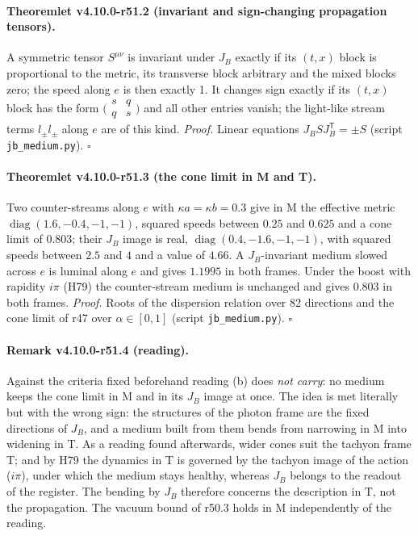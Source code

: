 \paragraph{Theoremlet v4.10.0-r51.2 (invariant and sign-changing propagation tensors).}
A symmetric tensor \(S^{\mu\nu}\) is invariant under \(J_B\) exactly if its \((t,x)\) block is proportional to the metric, its transverse block arbitrary and the mixed blocks
zero; the speed along \(e\) is then exactly 1.  It changes sign exactly if its \((t,x)\) block has the form \(\bigl(\begin{smallmatrix}s&q\\q&s\end{smallmatrix}\bigr)\) and all other entries vanish; the light-like
stream terms \(l_\pm l_\pm\) along \(e\) are of this kind.
\emph{Proof.} Linear equations \(J_BSJ_B^{\mathsf T}=\pm S\) (script \texttt{jb\_\allowbreak medium.py}).  \(\square\)

\paragraph{Theoremlet v4.10.0-r51.3 (the cone limit in M and T).}
Two counter-streams along \(e\) with \(\kappa a=\kappa b=0.3\) give in M the effective metric \(\operatorname{diag}(1.6,-0.4,-1,-1)\), squared speeds between \(0.25\) and \(0.625\) and a cone limit of
\(0.803\); their \(J_B\) image is real, \(\operatorname{diag}(0.4,-1.6,-1,-1)\), with squared speeds between \(2.5\) and \(4\) and a value of \(4.66\).  A \(J_B\)-invariant medium slowed across \(e\) is luminal along \(e\)
and gives \(1.1995\) in both frames.  Under the boost with rapidity \(i\pi\) (H79) the counter-stream medium is unchanged and gives \(0.803\) in both frames.
\emph{Proof.} Roots of the dispersion relation over 82 directions and the cone limit of r47 over \(\alpha\in[0,1]\) (script \texttt{jb\_\allowbreak medium.py}).  \(\square\)

\paragraph{Remark v4.10.0-r51.4 (reading).}
Against the criteria fixed beforehand reading (b) does \emph{not carry}: no medium keeps the cone limit in M and in its \(J_B\) image at once.  The idea is
met literally but with the wrong sign: the structures of the photon frame are the fixed directions of \(J_B\), and a medium built from them bends from
narrowing in M into widening in T.  As a reading found afterwards, wider cones suit the tachyon frame T; and by H79 the dynamics in T is governed by
the tachyon image of the action (\(i\pi\)), under which the medium stays healthy, whereas \(J_B\) belongs to the readout of the register.  The bending by \(J_B\)
therefore concerns the description in T, not the propagation.  The vacuum bound of r50.3 holds in M independently of the reading.

